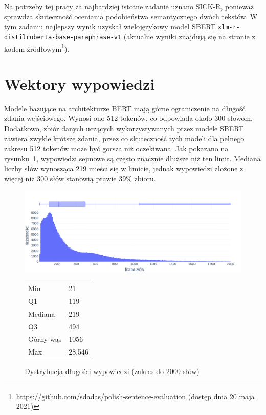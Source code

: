 	Na potrzeby tej pracy za najbardziej istotne zadanie uznano SICK-R, ponieważ sprawdza skuteczność oceniania podobieństwa semantycznego dwóch tekstów.
	W tym zadaniu najlepszy wynik uzyskał wielojęzykowy model SBERT \verb|xlm-r-distilroberta-base-paraphrase-v1|
		(aktualne wyniki znajdują się na stronie z kodem źródłowym\footnote{\url{https://github.com/sdadas/polish-sentence-evaluation} (dostęp dnia 20 maja 2021)}).

\section{Wektory wypowiedzi}\label{sec:sentences}
	Modele bazujące na architekturze BERT mają górne ograniczenie na długość zdania wejściowego.
	Wynosi ono 512 tokenów, co odpowiada około 300 słowom.
	Dodatkowo, zbiór danych uczących wykorzystywanych przez modele SBERT zawiera zwykle krótsze zdania,
		przez co skuteczność tych modeli dla pełnego zakresu 512 tokenów może być gorsza niż oczekiwana.
	Jak pokazano na rysunku~\ref{fig:word_count}, wypowiedzi sejmowe są często znacznie dłuższe niż ten limit.
	Mediana liczby słów wynosząca 219 mieści się w limicie, jednak wypowiedzi złożone z więcej niż 300 słów stanowią prawie 39\% zbioru.
  \begin{figure}[ht]
    \begin{minipage}{.75\textwidth}
      \includegraphics[width=\textwidth]{rys03/word_count.png}
    \end{minipage}%
    \begin{minipage}{.25\textwidth}
      \small
      \begin{tabularx}{\textwidth}{ll}
        Min & 21 \\ 
        Q1 & 119 \\ 
        Mediana & 219 \\
        Q3 & 494 \\ 
        Górny wąs & 1056 \\
        Max & 28.546 \\
      \end{tabularx}
    \end{minipage}
    \caption{Dystrybucja długości wypowiedzi (zakres do 2000 słów)}\label{fig:word_count}
  \end{figure}

